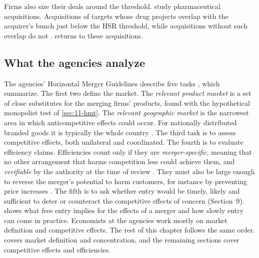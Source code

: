 Firms also size their deals around the threshold. \citet{CunninghamEdererMa2021} study pharmaceutical acquisitions.
Acquisitions of targets whose drug projects overlap with the acquirer's bunch just below the HSR threshold, while
acquisitions without such overlap do not \citep[pp.~226--227 and Figure 9]{AskerNocke2021}. 
returns to these acquisitions.

\subsection{What the agencies analyze}\label{sec:11-agencies}

The agencies' Horizontal Merger Guidelines describe five tasks \citep{USDOJFTC1992,USDOJFTC2010}, which
\citet[p.~7]{AshenfelterHosken2008} summarize. The first two
define the market. The \emph{relevant product market} is a set of close substitutes for the merging firms'
products, found with the hypothetical monopolist test of \cref{sec:11-hmt}. The \emph{relevant geographic market}
is the narrowest area in which anticompetitive effects could occur. For nationally distributed branded goods it is
typically the whole country \citep[p.~7]{AshenfelterHosken2008}. The third task is to assess competitive effects,
both unilateral and coordinated. The fourth is to evaluate efficiency claims. Efficiencies count only if they
are \emph{merger-specific}, meaning that no other arrangement that harms competition less could achieve them, and
\emph{verifiable} by the authority at the time of review \citep[p.~221]{AskerNocke2021}. They must also be large
enough to reverse the merger's potential to harm customers, for instance by preventing price increases
\citep[Section~10]{USDOJFTC2010}. The fifth is to ask whether entry would be timely, likely and sufficient to deter
or counteract the competitive effects of concern (Section~9).  shows what free entry implies
for the effects of a merger and how slowly entry can come in practice.
Economists at the agencies work mostly on market definition and competitive effects. The rest of this chapter
follows the same order.  covers market definition and concentration, and the remaining
sections cover competitive effects and efficiencies.

